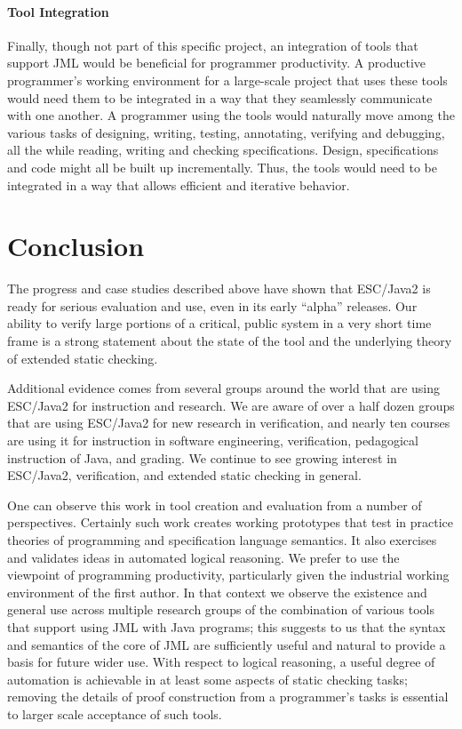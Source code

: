 \documentclass{llncs}
\begin{document}
\paragraph*{Tool Integration} Finally, though not part of this specific
project, an integration of tools that support JML would be beneficial
for programmer productivity.  A productive programmer's working
environment for a large-scale project that uses these tools would need
them to be integrated in a way that they seamlessly communicate
with one another.  A programmer using the tools would naturally move
among the various tasks of designing, writing, testing, annotating,
verifying and debugging, all the while reading, writing and checking
specifications.  Design, specifications and code might all be built up
incrementally.  Thus, the tools would need to be integrated in a way
that allows efficient and iterative behavior.

\section{Conclusion}

The progress and case studies described above have shown that
ESC/Java2 is ready for serious evaluation and use, even in its early
``alpha'' releases.  Our ability to verify large portions of a
critical, public system in a very short time frame is a strong
statement about the state of the tool and the underlying theory of
extended static checking.

Additional evidence comes from several groups around the world that
are using ESC/Java2 for instruction and research.  We are aware of
over a half dozen groups that are using ESC/Java2 for new research in
verification, and nearly ten courses are using it for instruction in
software engineering, verification, pedagogical instruction of Java,
and grading.  We continue to see growing interest in ESC/Java2,
verification, and extended static checking in general.

One can observe this work in tool creation and evaluation from a
number of perspectives.  Certainly such work creates working
prototypes that test in practice theories of programming and
specification language semantics.  It also exercises and validates
ideas in automated logical reasoning.  We prefer to use the viewpoint
of programming productivity, particularly given the industrial working
environment of the first author.  In that context we observe the
existence and general use across multiple research groups of the
combination of various tools that support using JML with Java
programs; this suggests to us that the syntax and semantics of the
core of JML are sufficiently useful and natural to provide a basis for
future wider use.  With respect to logical reasoning, a useful degree
of automation is achievable in at least some aspects of static
checking tasks; removing the details of proof construction from a
programmer's tasks is essential to larger scale acceptance of such
tools.
\end{document}
